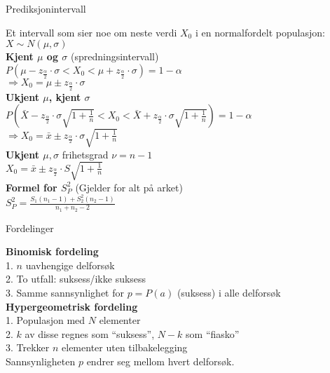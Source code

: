 \documentclass[final,hyperref={pdfpagelabels=false}]{beamer}
\begin{document}
\begin{frame}{}
\begin{columns}[t]
		\begin{column}{.25\linewidth}
			\begin{block}{}
				\center\normalsize Prediksjonintervall\\
				{\footnotesize\raggedright
					Et intervall som sier noe om neste verdi $X_0$ i en normalfordelt populasjon: $X\sim N(\mu,\sigma)$\\
					\textbf{Kjent $\mu$ og $\sigma$} (spredningsintervall)\\
					$P\left( \mu - z_\frac{\alpha}{2} \cdot \sigma < X_0 < \mu + z_\frac{\alpha}{2} \cdot \sigma \right)=1-\alpha$\\
					$\Rightarrow X_0=\mu \pm z_\frac{\alpha}{2}\cdot \sigma$\\
					\textbf{Ukjent $\mu$, kjent $\sigma$} \\
					$P\left( \bar X - z_\frac{\alpha}{2} \cdot \sigma \sqrt{1 + \frac{1}{n}} < X_0 < \bar X + z_\frac{\alpha}{2} \cdot \sigma \sqrt{1 + \frac{1}{n}} \right)=1-\alpha$\\
					$\Rightarrow X_0=\bar x \pm z_\frac{\alpha}{2}\cdot \sigma \sqrt{1 + \frac{1}{n}}$\\
					\textbf{Ukjent $\mu, \sigma$} frihetsgrad $\nu=n-1$\\
					$X_0=\bar x \pm z_\frac{\alpha}{2} \cdot S\sqrt{1 + \frac{1}{n}}$ \\
					\textbf{Formel for $S_P^2$} (Gjelder for alt på arket) \\
					$S_P^2=\frac{S_1(n_1-1)+S_2^2(n_2-1)}{n_1 + n_2 - 2}$
				}
			\end{block}
			\begin{block}{\center\normalsize Fordelinger}
				{\footnotesize\raggedright
					\textbf{Binomisk fordeling}\\
					1. $n$ uavhengige delforsøk\\
					2. To utfall: suksess/ikke suksess\\
					3. Samme sannsynlighet for $p=P(a)$ (suksess) i alle delforsøk\\
					\textbf{Hypergeometrisk fordeling}\\
					1. Populasjon med $N$ elementer\\
					2. $k$ av disse regnes som ``suksess'', $N-k$ som ``fiasko''\\
					3. Trekker $n$ elementer uten tilbakelegging\\
					Sannsynligheten $p$ endrer seg mellom hvert delforsøk.
}
\end{block}
\end{column}
\end{columns}
\end{frame}
\end{document}
